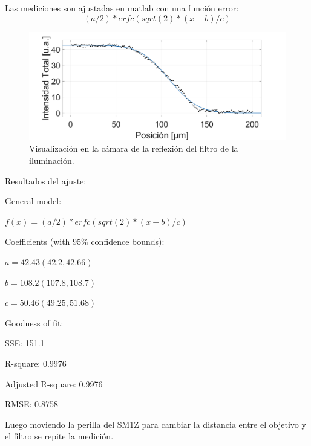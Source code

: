 Las mediciones son ajustadas en matlab con una función error:
\begin{equation}
	(a/2)*erfc(sqrt(2)*(x-b)/c)
\end{equation}

\begin{figure}[H]
	\centering
	\includegraphics[scale=0.3]{Figs/microespectrometro/fit0.png}
	\caption{Visualización en la cámara de la reflexión del filtro de la iluminación.}
	\label{fig:bgcel}
\end{figure}

Resultados del ajuste:

General model:\par
$f(x) = (a/2)*erfc(sqrt(2)*(x-b)/c)$ \par
Coefficients (with 95$\%$ confidence bounds): \par
$a =       42.43  (42.2, 42.66)$\par
$b =       108.2  (107.8, 108.7)$\par
$c =       50.46  (49.25, 51.68)$\par

Goodness of fit:\par
SSE: 151.1\par
R-square: 0.9976\par
Adjusted R-square: 0.9976\par
RMSE: 0.8758\par

Luego moviendo la perilla del SM1Z para cambiar la distancia entre el objetivo y el filtro se repite la medición.


